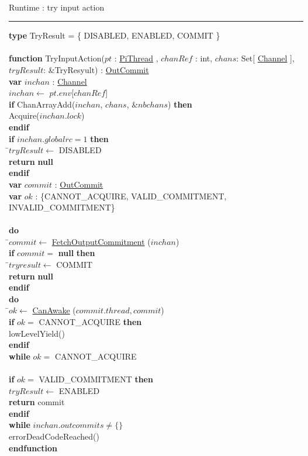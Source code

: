 \documentclass[a4paper,11pt]{article}
\newenvironment{program}{
  \begin{sffamily}
  \begin{scriptsize}
  \begin{tabbing}}
 {\end{tabbing}
  \end{scriptsize}
  \end{sffamily}}
\newcommand{\kw}[1]{\textsf{\textbf{#1}}}
\newcommand{\pindent}{\hspace{2em}\=}
\newcommand{\synchro}[1]{\textcolor{synchrocolor}{#1}}
\newcommand{\algotitle}[1]{\noindent\\ \noindent#1\par\nobreak\vspace{3pt}\hrule\vspace{6pt}}
\newcommand{\algosection}[1]{
  \phantomsection
  \algotitle{#1}
}
\newcommand{\myref}[1]{
  \hyperref[#1]{#1}
}
\begin{document}
\algosection{Runtime : try input action}
\begin{program}
  \kw{type} TryResult = \{ DISABLED, ENABLED, COMMIT \} \\
\\
  \kw{function} TryInputAction($pt$ : \myref{PiThread}, $chanRef$ : int, $chans$: Set[\myref{Channel}], $tryResult$: \&TryResyult) : \myref{OutCommit} \\
  \pindent \kw{var} $inchan$ : \myref{Channel} \\
  \> $inchan \leftarrow$ $pt$.$env$[$chanRef$] \\
  \> \kw{if} ChanArrayAdd($inchan$, $chans$, $\&nbchans$) \kw{then} \\
  \>\pindent\synchro{Acquire($inchan.lock$)} \\
  \>\kw{endif} \\
  \>\kw{if} $inchan.globalrc = 1$ \kw{then} \\
  \>\pindent$tryResult \leftarrow$ DISABLED \\
  \>\>\kw{return} \kw{null} \\
  \>\kw{endif} \\
  \>\kw{var} $commit$ : \myref{OutCommit} \\
  \>\kw{var} $ok$ : \{CANNOT\_ACQUIRE, VALID\_COMMITMENT, INVALID\_COMMITMENT\} \\
  \>\\
  \>\kw{do} \\
  \>\pindent$commit \leftarrow$ \myref{FetchOutputCommitment}($inchan$) \\
  \>\>\kw{if} $commit =$ \kw{null} \kw{then} \\
  \>\>\pindent$tryresult \leftarrow$ COMMIT \\
  \>\>\>\kw{return} \kw{null} \\
  \>\>\kw{endif} \\

  \>\>\kw{do} \\
  \>\>\pindent$ok \leftarrow$ \myref{CanAwake}($commit.thread, commit$) \\
  \>\>\>\kw{if} $ok =$ CANNOT\_ACQUIRE \kw{then} \\
  \>\>\>\pindent\synchro{lowLevelYield()} \\
  \>\>\>\kw{endif} \\
  \>\>\kw{while} $ok =$ CANNOT\_ACQUIRE \\
  \>\>\\
  \>\>\kw{if} $ok =$ VALID\_COMMITMENT \kw{then} \\
  \>\>\> $tryResult \leftarrow$ ENABLED \\
  \>\>\> \kw{return} commit \\
  \>\>\kw{endif} \\
  \>\kw{while} $inchan.outcommits \neq \{\}$ \\
  errorDeadCodeReached() \\
  \kw{endfunction}
\end{program}
\end{document}
